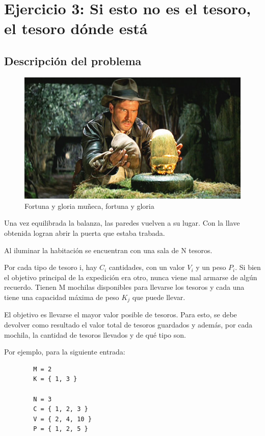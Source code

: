 \section{Ejercicio 3: Si esto no es el tesoro, el tesoro dónde está}
    \subsection{Descripción del problema}

		\begin{figure}[ht]
			\begin{center}
				\includegraphics[width=0.4\columnwidth]{imagenes/tesoros.jpg}
				\caption{Fortuna y gloria muñeca, fortuna y gloria}
			\end{center}
		\end{figure}

        Una vez equilibrada la balanza, las paredes vuelven a su lugar. Con la llave obtenida logran abrir la puerta que estaba trabada. \par
		Al iluminar la habitación se encuentran con una sala de N tesoros. \par
		Por cada tipo de tesoro i, hay $C_{i}$ cantidades, con un valor $V_{i}$ y un peso $P_{i}$. Si bien el objetivo principal de la expedición era otro, nunca viene mal armarse de algún recuerdo. 
		Tienen M mochilas disponibles para llevarse los tesoros y cada una tiene una capacidad máxima de peso $K_{j}$ que puede llevar. \par
		El objetivo es llevarse el mayor valor posible de tesoros. Para esto, se debe devolver como resultado el valor total de tesoros guardados y además, por cada mochila, la cantidad de tesoros llevados y de qué tipo son.

        Por ejemplo, para la siguiente entrada:
        
        \begin{verbatim}
        M = 2
        K = { 1, 3 }
        
        N = 3 
        C = { 1, 2, 3 }
        V = { 2, 4, 10 }
        P = { 1, 2, 5 }
        \end{verbatim}


